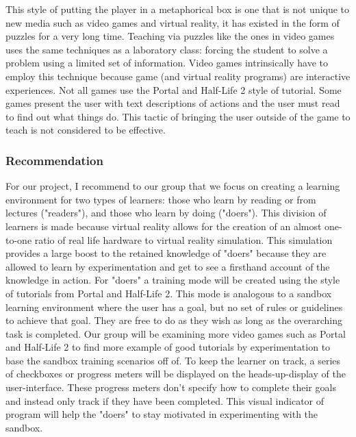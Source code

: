 \documentclass[onecolumn, draftclsnofoot,10pt, compsoc]{IEEEtran}
\begin{document}
This style of putting the player in a metaphorical box is one that is not unique to new media such as video games and virtual reality, it has existed in the form of puzzles for a very long time. Teaching via puzzles like the ones in video games uses the same techniques as a laboratory class: forcing the student to solve a problem using a limited set of information. Video games intrinsically have to employ this technique because game (and virtual reality programs) are interactive experiences. Not all games use the Portal and Half-Life 2 style of tutorial. Some games present the user with text descriptions of actions and the user must read to find out what things do. This tactic of bringing the user outside of the game to teach is not considered to be effective. \cite{tutorials}

\subsubsection{Recommendation}
For our project, I recommend to our group that we focus on creating a learning environment for two types of learners: those who learn by reading or from lectures ("readers"), and those who learn by doing ("doers"). This division of learners is made because virtual reality allows for the creation of an almost one-to-one ratio of real life hardware to virtual reality simulation. This simulation provides a large boost to the retained knowledge of "doers" because they are allowed to learn by experimentation and get to see a firsthand account of the knowledge in action. For "doers" a training mode will be created using the style of tutorials from Portal and Half-Life 2. This mode is analogous to a sandbox learning environment where the user has a goal, but no set of rules or guidelines to achieve that goal. They are free to do as they wish as long as the overarching task is completed. Our group will be examining more video games such as Portal and Half-Life 2 to find more example of good tutorials by experimentation to base the sandbox training scenarios off of. To keep the learner on track, a series of checkboxes or progress meters will be displayed on the heads-up-display of the user-interface. These progress meters don't specify how to complete their goals and instead only track if they have been completed. This visual indicator of program will help the "doers" to stay motivated in experimenting with the sandbox.
\end{document}
